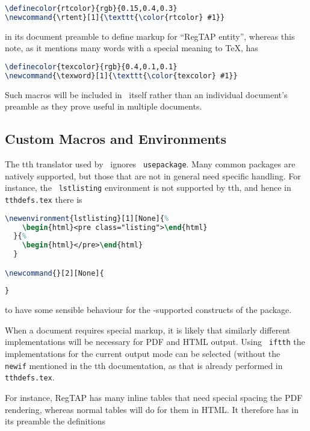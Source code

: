 \documentclass[11pt,a4paper]{ivoa}
\newcommand{\texword}[1]{\texttt{\color{texcolor} #1}}
\begin{document}
\begin{lstlisting}[language=TeX]
\definecolor{rtcolor}{rgb}{0.15,0.4,0.3}
\newcommand{\rtent}[1]{\texttt{\color{rtcolor} #1}}
\end{lstlisting}

in its document preamble to
define markup for ``RegTAP entity'', whereas
this note, as it mentions many words with a special meaning to \TeX, has

\begin{lstlisting}[language=TeX]
\definecolor{texcolor}{rgb}{0.4,0.1,0.1}
\newcommand{\texword}[1]{\texttt{\color{texcolor} #1}}
\end{lstlisting}

Such macros will be included in \ivoatex\ itself rather than an
individual document's preamble as they prove useful in multiple
documents.

\subsection{Custom Macros and Environments}

The tth translator used by \ivoatex\ ignores \texword{usepackage}.  Many
common packages are natively supported, but those that are not in
general need specific handling.  For instance, the \texword{lstlisting}
environment is not supported by tth, and hence in
\texttt{tthdefs.tex} there is

\begin{lstlisting}[language=TeX]
\newenvironment{lstlisting}[1][None]{%
    \begin{html}<pre class="listing">\end{html}
  }{%
    \begin{html}</pre>\end{html}
  }

\newcommand{}[2][None]{
  
}
\end{lstlisting}

to have some sensible behaviour for the \ivoatex-supported constructs of
the package.

When a document requires special markup, it is likely that similarly
different implementations will be necessary for PDF and HTML output.
Using \texword{iftth} the implementations for the current output mode
can be selected (without the \texword{newif} mentioned in the tth
documentation, as that is already performed in \texttt{tthdefs.tex}.

For instance, RegTAP has many inline tables that need special spacing
the PDF rendering, whereas normal tables will do for them
in HTML.  It therefore
has in its preamble the definitions
\end{document}
